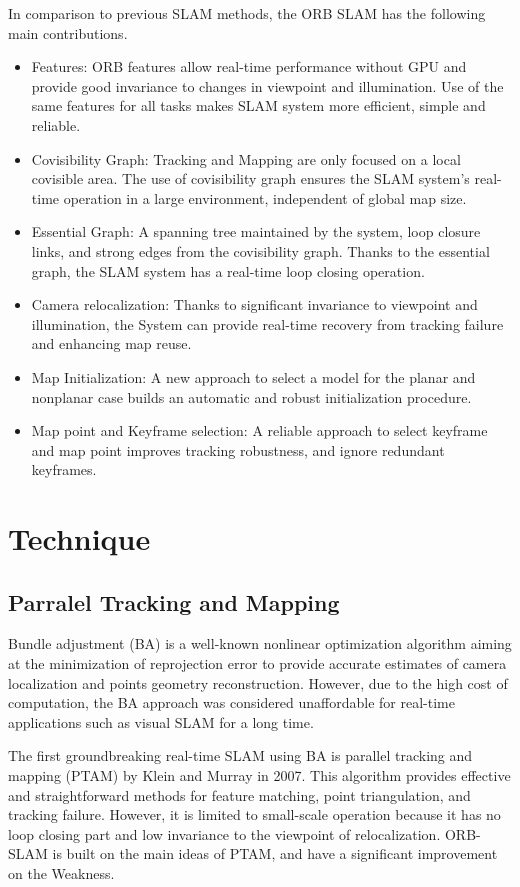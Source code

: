 \documentclass[letterpaper, 10 pt, conference]{ieeeconf}  %
\begin{document}
In comparison to previous SLAM methods, the ORB SLAM has the following main contributions.
\begin{itemize}


\item Features:  ORB features allow real-time performance without GPU and provide good invariance to changes in viewpoint and illumination. Use of the same features for all tasks makes SLAM system more efficient, simple and reliable. 
\item Covisibility Graph: Tracking and Mapping are only focused on a local covisible area. The use of covisibility graph ensures the SLAM system's real-time operation in a large environment, independent of global map size.
\item Essential Graph: A spanning tree maintained by the system, loop closure links, and strong edges from the covisibility graph. Thanks to the essential graph, the SLAM system has a real-time loop closing operation.
\item Camera relocalization: Thanks to significant invariance to viewpoint and illumination, the System can provide real-time recovery from tracking  failure and enhancing map reuse.
\item Map Initialization: A new approach to select a model for the planar and nonplanar case builds an automatic and robust initialization procedure. 
\item Map point and Keyframe selection: A reliable approach to select keyframe and map point improves tracking robustness, and ignore redundant keyframes.

\end{itemize}


\section{Technique}
\subsection{Parralel Tracking and Mapping}
Bundle adjustment (BA) is a well-known nonlinear optimization algorithm aiming at the minimization of reprojection error to provide accurate estimates of camera localization and points geometry reconstruction. However, due to the high cost of computation, the BA approach was considered unaffordable for real-time applications such as visual SLAM for a long time.

The first groundbreaking real-time SLAM using BA is parallel tracking and mapping (PTAM) by Klein and Murray in 2007. This algorithm provides effective and straightforward methods for feature matching, point triangulation, and tracking failure.  However, it is limited to small-scale operation because it has no loop closing part and low invariance to the viewpoint of relocalization. ORB-SLAM is built on the main ideas of PTAM, and have a significant improvement on the Weakness.
\end{document}
